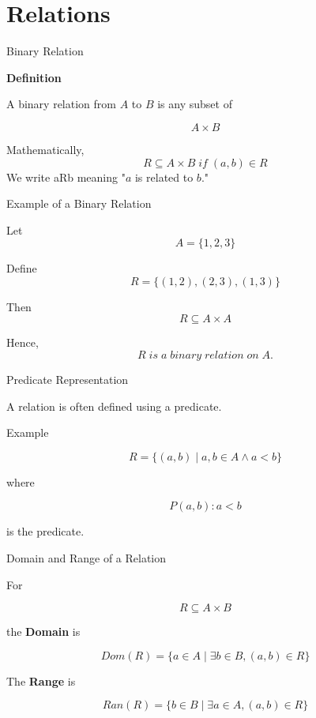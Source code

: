 \section{Relations}

\begin{frame}{Binary Relation}

\textbf{Definition}

A binary relation from $A$ to $B$ is any subset of

\[
A\times B
\]

Mathematically,
\[
R\subseteq A\times B \;if \;(a,b)\in R\]
We write aRb meaning "$a$ is related to $b$."

\end{frame}


\begin{frame}{Example of a Binary Relation}

Let
\[
A=\{1,2,3\}
\]

Define
\[
R=
\{
(1,2),
(2,3),
(1,3)
\}
\]

Then
\[
R\subseteq A\times A
\]

Hence,
\[
R\;is\; a\; binary\; relation\; on\; A.
\]

\end{frame}


\begin{frame}{Predicate Representation}

A relation is often defined using a predicate.

\vspace{0.4cm}

Example

\[
R=
\{
(a,b)
\mid
a,b\in A
\land
a<b
\}
\]

where

\[
P(a,b):a<b
\]

is the predicate.

\end{frame}


\begin{frame}{Domain and Range of a Relation}

For

\[
R\subseteq A\times B
\]

the \textbf{Domain} is

\[
Dom(R)
=
\{
a\in A
\mid
\exists b\in B,
(a,b)\in R
\}
\]

The \textbf{Range} is

\[
Ran(R)
=
\{
b\in B
\mid
\exists a\in A,
(a,b)\in R
\}
\]

\end{frame}